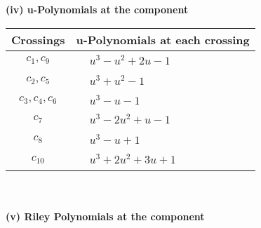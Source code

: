 \documentclass[1p]{elsarticle_modified}
\theoremstyle{definition}
\begin{document}
\newpage\renewcommand{\arraystretch}{1}
\flushleft \textbf{(iv) u-Polynomials at the component}\newline \\
\begin{tabular}{m{50pt}|m{274pt}}
Crossings & \hspace{64pt}u-Polynomials at each crossing \\
\hline $$\begin{aligned}c_{1},c_{9}\end{aligned}$$&$\begin{aligned}
&u^3- u^2+2 u-1
\end{aligned}$\\
\hline $$\begin{aligned}c_{2},c_{5}\end{aligned}$$&$\begin{aligned}
&u^3+u^2-1
\end{aligned}$\\
\hline $$\begin{aligned}c_{3},c_{4},c_{6}\end{aligned}$$&$\begin{aligned}
&u^3- u-1
\end{aligned}$\\
\hline $$\begin{aligned}c_{7}\end{aligned}$$&$\begin{aligned}
&u^3-2 u^2+u-1
\end{aligned}$\\
\hline $$\begin{aligned}c_{8}\end{aligned}$$&$\begin{aligned}
&u^3- u+1
\end{aligned}$\\
\hline $$\begin{aligned}c_{10}\end{aligned}$$&$\begin{aligned}
&u^3+2 u^2+3 u+1
\end{aligned}$\\
\hline
\end{tabular}\\~\\
\newpage\renewcommand{\arraystretch}{1}
\flushleft \textbf{(v) Riley Polynomials at the component}\newline \\
\end{document}
